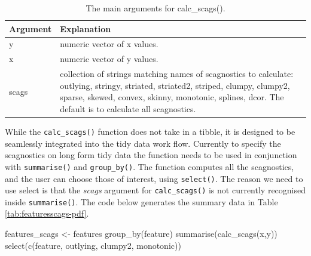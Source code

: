\begin{Schunk}
\begin{table}

\caption{\label{tab:calcfunc-tb-pdf}The main arguments for calc\_scags().}
\centering
\begin{tabular}[t]{l>{\raggedright\arraybackslash}p{12cm}}
\toprule
Argument & Explanation\\
\midrule
y & numeric vector of x values.\\
x & numeric vector of y values.\\
scags & collection of strings matching names of scagnostics to calculate: outlying, stringy, striated, striated2, striped, clumpy, clumpy2, sparse, skewed, convex, skinny, monotonic, splines, dcor. The default is to calculate all scagnostics.\\
\bottomrule
\end{tabular}
\end{table}

\end{Schunk}

While the \texttt{calc\_scags()} function does not take in a tibble, it
is designed to be seamlessly integrated into the tidy data work flow.
Currently to specify the scagnostics on long form tidy data the function
needs to be used in conjunction with \texttt{summarise()} and
\texttt{group\_by()}. The function computes all the scagnostics, and the
user can choose those of interest, using \texttt{select()}. The reason
we need to use select is that the \emph{scags} argument for
\texttt{calc\_scags()} is not currently recognised inside
\texttt{summarise()}. The code below generates the summary data in Table
\ref{tab:featuresscags-pdf}.

\begin{Schunk}
\begin{Sinput}
features_scags <- features %
  group_by(feature) %
  summarise(calc_scags(x,y)) %
  select(c(feature, outlying, clumpy2, monotonic))
\end{Sinput}
\end{Schunk}

